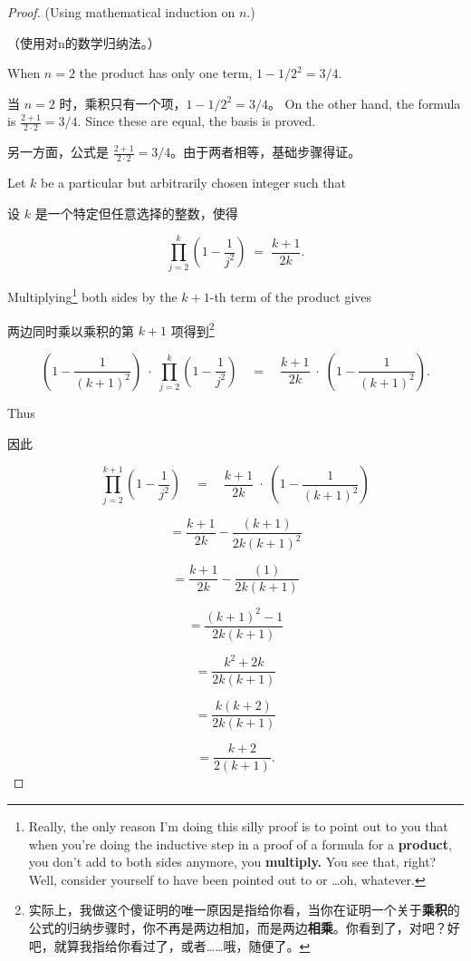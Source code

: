 \begin{proof}
(Using mathematical induction on $n$.)

（使用对n的数学归纳法。）

 When $n = 2$ the product has only one term, $1-1/2^2 = 3/4$.

当 $n = 2$ 时，乘积只有一个项，$1-1/2^2 = 3/4$。
On the other hand, the formula is 
$\displaystyle \frac{2+1}{2\cdot2} = 3/4$.  Since these are equal, the 
basis is proved.

另一方面，公式是 $\displaystyle \frac{2+1}{2\cdot2} = 3/4$。由于两者相等，基础步骤得证。


Let $k$ be a particular but arbitrarily chosen integer such that

设 $k$ 是一个特定但任意选择的整数，使得

\[ \prod_{j=2}^k \left( 1 - \frac{1}{j^2} \right) \; = \; \frac{k+1}{2k}. \]

Multiplying\footnote{Really, the only reason I'm doing this silly proof is to 
point out to you that when you're doing the inductive step in a proof of a 
formula for a {\bf product}, you don't add to both sides anymore, you {\bf multiply.} You see that, right?
Well, consider yourself to have been pointed out to or \ldots oh, whatever.}  both sides by the $k+1$-th term of the product 
gives

两边同时乘以乘积的第 $k+1$ 项得到\footnote{实际上，我做这个傻证明的唯一原因是指给你看，当你在证明一个关于{\bf 乘积}的公式的归纳步骤时，你不再是两边相加，而是两边{\bf 相乘}。你看到了，对吧？好吧，就算我指给你看过了，或者……哦，随便了。}

\[ \left( 1 - \frac{1}{(k+1)^2} \right) \; \cdot \; \prod_{j=2}^k \left( 1 - \frac{1}{j^2} \right) \quad  = \quad \frac{k+1}{2k} \; \cdot \; \left( 1 - \frac{1}{(k+1)^2} \right). \]

Thus 

因此

\[ \prod_{j=2}^{k+1} \left( 1 - \frac{1}{j^2} \right) \quad  = \quad \frac{k+1}{2k} \; \cdot \; \left( 1 - \frac{1}{(k+1)^2} \right) \]

\[ = \frac{k+1}{2k} - \frac{(k+1)}{2k(k+1)^2} \]

\[ = \frac{k+1}{2k} - \frac{(1)}{2k(k+1)} \]

\[ = \frac{(k+1)^2 - 1}{2k(k+1)} \]

\[ = \frac{k^2+2k}{2k(k+1)} \]

\[ = \frac{k (k+2)}{2k(k+1)} \]

\[ = \frac{k+2}{2(k+1)}.
\]

\end{proof}

